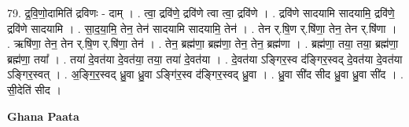 \documentclass[17pt]{extarticle}
\begin{document}
79. द्र॒वि॒णो॒दामिति॑ द्रविणः - दाम् । . त्वा॒ द्रवि॑णे॒ द्रवि॑णे त्वा त्वा॒ द्रवि॑णे । . द्रवि॑णे सादयामि सादयामि॒ द्रवि॑णे॒ द्रवि॑णे सादयामि । . सा॒द॒या॒मि॒ तेन॒ तेन॑ सादयामि सादयामि॒ तेन॑ । . तेन र्.षि॒ण र्.षि॑णा॒ तेन॒ तेन र्.षि॑णा । . ऋषि॑णा॒ तेन॒ तेन र्.षि॒ण र्.षि॑णा॒ तेन॑ । . तेन॒ ब्रह्म॑णा॒ ब्रह्म॑णा॒ तेन॒ तेन॒ ब्रह्म॑णा । . ब्रह्म॑णा॒ तया॒ तया॒ ब्रह्म॑णा॒ ब्रह्म॑णा॒ तया᳚ । . तया॑ दे॒वत॑या दे॒वत॑या॒ तया॒ तया॑ दे॒वत॑या । . दे॒वत॑या ऽङ्गिर॒स्व द॑ङ्गिर॒स्वद् दे॒वत॑या दे॒वत॑या ऽङ्गिर॒स्वत् । . अ॒ङ्गि॒र॒स्वद् ध्रु॒वा ध्रु॒वा ऽङ्गि॑र॒स्व द॑ङ्गिर॒स्वद् ध्रु॒वा । . ध्रु॒वा सी॑द सीद ध्रु॒वा ध्रु॒वा सी॑द । . सी॒देति॑ सीद । \newline

\textbf{Ghana Paata } \newline
\end{document}

